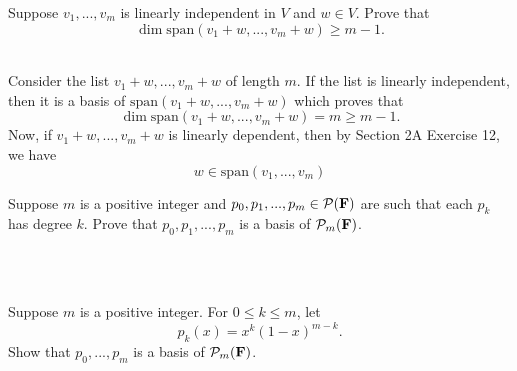 \begin{exercise}
    Suppose $v_1, ..., v_m$ is linearly independent in $V$ and $w \in V$. Prove that
    $$\dim \text{span}(v_1 + w, ..., v_m + w) \geq m-1.$$
\end{exercise}

\begin{solution}
    \td \\ Consider the list $v_1 + w, ..., v_m + w$ of length $m$. If the list is linearly independent, then it is a basis of $\text{span}(v_1 + w, ..., v_m + w)$ which proves that 
    $$\dim \text{span}(v_1 + w, ..., v_m + w) = m \geq m-1.$$
    Now, if $v_1 + w, ..., v_m + w$ is linearly dependent, then by Section 2A Exercise 12, we have 
    $$w \in \text{span}(v_1, ..., v_m) $$
\end{solution}

\begin{exercise}
    Suppose $m$ is a positive integer and $p_0, p_1, ..., p_m \in \mathcal{P}(\mathbf{F})$ are such that each $p_k$ has degree $k$. Prove that $p_0, p_1, ..., p_m$ is a basis of $\mathcal{P}_m(\mathbf{F})$.\\
\end{exercise}

\begin{solution}
    \\ \td \\
\end{solution}

\begin{exercise}
    Suppose $m$ is a positive integer. For $0 \leq k \leq m$, let 
    $$p_k(x) = x^k(1-x)^{m-k}.$$
    Show that $p_0, ..., p_m$ is a basis of $\mathcal{P}_m(\mathbf{F})$.\\
\end{exercise}

\begin{solution}
    \\ \td \\
\end{solution}